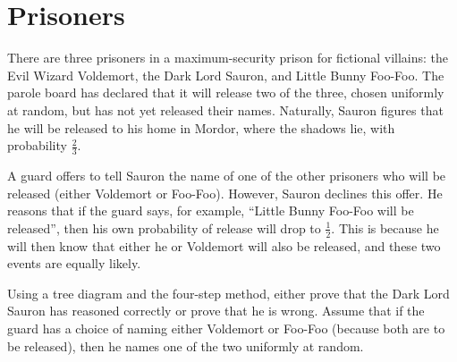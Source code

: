 \documentclass[12pt]{article}
\begin{document}

\newpage

\section{Prisoners}
There are three prisoners in a maximum-security prison for fictional
villains: the Evil Wizard Voldemort, the Dark Lord Sauron, and Little
Bunny Foo-Foo.  The parole board has declared that it will release two
of the three, chosen uniformly at random, but has not yet released
their names.  Naturally, Sauron figures that he will be released to
his home in Mordor, where the shadows lie, with probability
$\frac{2}{3}$.

A guard offers to tell Sauron the name of one of the other prisoners
who will be released (either Voldemort or Foo-Foo).  However, Sauron
declines this offer.  He reasons that if the guard says, for example,
``Little Bunny Foo-Foo will be released'', then his own probability of
release will drop to $\frac{1}{2}$.  This is because he will then know
that either he or Voldemort will also be released, and these two
events are equally likely.

Using a tree diagram and the four-step method, either prove that the
Dark Lord Sauron has reasoned correctly or prove that he is wrong.
Assume that if the guard has a choice of naming either Voldemort or
Foo-Foo (because both are to be released), then he names one of the
two uniformly at random.
\end{document}
